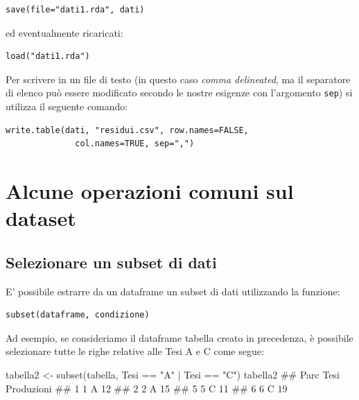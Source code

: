 \documentclass[a4paper,12pt,oneside]{book}
\newenvironment{Shaded}{\begin{snugshade}}{\end{snugshade}}
\newcommand{\SpecialCharTok}[1]{#1}
\newcommand{\StringTok}[1]{#1}
\newcommand{\DocumentationTok}[1]{#1}
\newcommand{\OtherTok}[1]{#1}
\newcommand{\FunctionTok}[1]{#1}
\newcommand{\NormalTok}[1]{#1}
\begin{document}
\begin{verbatim}
save(file="dati1.rda", dati)
\end{verbatim}

ed eventualmente ricaricati:

\begin{verbatim}
load("dati1.rda")
\end{verbatim}

Per scrivere in un file di testo (in questo caso \emph{comma delineated}, ma il separatore di elenco può essere modificato secondo le nostre esigenze con l'argomento \texttt{sep}) si utilizza il seguente comando:

\begin{verbatim}
write.table(dati, "residui.csv", row.names=FALSE, 
              col.names=TRUE, sep=",")
\end{verbatim}

\hypertarget{alcune-operazioni-comuni-sul-dataset}{%
\section*{Alcune operazioni comuni sul dataset}\label{alcune-operazioni-comuni-sul-dataset}}

\hypertarget{selezionare-un-subset-di-dati}{%
\subsection*{Selezionare un subset di dati}\label{selezionare-un-subset-di-dati}}

E' possibile estrarre da un dataframe un subset di dati utilizzando la funzione:

\begin{verbatim}
subset(dataframe, condizione)
\end{verbatim}

Ad esempio, se consideriamo il dataframe tabella creato in precedenza, è possibile selezionare tutte le righe relative alle Tesi A e C come segue:

\begin{Shaded}
\begin{Highlighting}[]
\NormalTok{tabella2  }\OtherTok{\textless{}{-}}  \FunctionTok{subset}\NormalTok{(tabella, Tesi }\SpecialCharTok{==} \StringTok{"A"} \SpecialCharTok{|}\NormalTok{ Tesi }\SpecialCharTok{==} \StringTok{"C"}\NormalTok{)}
\NormalTok{tabella2}
\DocumentationTok{\#\#   Parc Tesi Produzioni}
\DocumentationTok{\#\# 1    1    A         12}
\DocumentationTok{\#\# 2    2    A         15}
\DocumentationTok{\#\# 5    5    C         11}
\DocumentationTok{\#\# 6    6    C         19}
\end{Highlighting}
\end{Shaded}
\end{document}

